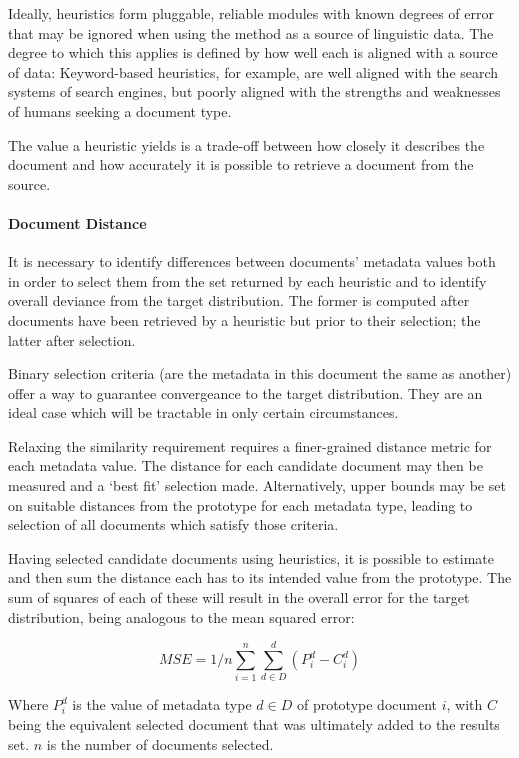 Ideally, heuristics form pluggable, reliable modules with known degrees of error that may be ignored when using the method as a source of linguistic data.  The degree to which this applies is defined by how well each is aligned with a source of data: Keyword-based heuristics, for example, are well aligned with the search systems of search engines, but poorly aligned with the strengths and weaknesses of humans seeking a document type.

The value a heuristic yields is a trade-off between how closely it describes the document and how accurately it is possible to retrieve a document from the source. 


\paragraph{Document Distance}
It is necessary to identify differences between documents' metadata values both in order to select them from the set returned by each heuristic and to identify overall deviance from the target distribution.  The former is computed after documents have been retrieved by a heuristic but prior to their selection; the latter after selection.

Binary selection criteria (are the metadata in this document the same as another) offer a way to guarantee convergeance to the target distribution.  They are an ideal case which will be tractable in only certain circumstances.

Relaxing the similarity requirement requires a finer-grained distance metric for each metadata value.  The distance for each candidate document may then be measured and a `best fit' selection made.  Alternatively, upper bounds may be set on suitable distances from the prototype for each metadata type, leading to selection of all documents which satisfy those criteria.

Having selected candidate documents using heuristics, it is possible to estimate and then sum the distance each has to its intended value from the prototype.  The sum of squares of each of these will result in the overall error for the target distribution, being analogous to the mean squared error:

$$
MSE = 1/n\sum_{i=1}^{n}\sum_{d \in D}^{d}{(P_i^d - C_i^d)}
$$ 

Where $P_i^d$ is the value of metadata type $d \in D$ of prototype document $i$, with $C$ being the equivalent selected document that was ultimately added to the results set.  $n$ is the number of documents selected.




